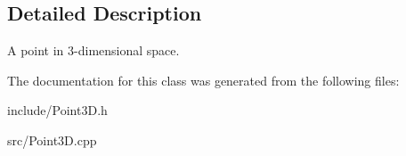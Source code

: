 \subsection{Detailed Description}
A point in 3-\/dimensional space. 

The documentation for this class was generated from the following files\+:\begin{DoxyCompactItemize}
\item 
include/Point3\+D.\+h\item 
src/Point3\+D.\+cpp\end{DoxyCompactItemize}
